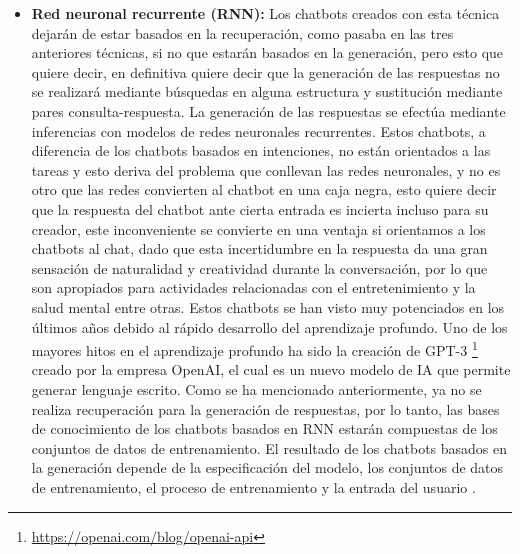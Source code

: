 \begin{itemize}
Muchas de las grandes plataformas actualmente están orientadas a la creación de chatbots de este tipo, como puede ser la plataforma de Google con Dialogflow \footnote{\url{https://dialogflow.cloud.google.com}} (originalmente llamado Api.ai) o la plataforma de código abierto de Rasa. \footnote{\url{https://rasa.com/}}.
\item \textbf{Red neuronal recurrente (RNN):} Los chatbots creados con esta técnica dejarán de estar basados en la recuperación, como pasaba en las tres anteriores técnicas, si no que estarán basados en la generación, pero esto que quiere decir, en definitiva quiere decir que la generación de las respuestas no se realizará mediante búsquedas en alguna estructura y sustitución mediante pares consulta-respuesta. La generación de las respuestas se efectúa mediante inferencias con modelos de redes neuronales recurrentes. Estos chatbots, a diferencia de los chatbots basados en intenciones, no están orientados a las tareas y esto deriva del problema que conllevan las redes neuronales, y no es otro que las redes convierten al chatbot en una caja negra, esto quiere decir que la respuesta del chatbot ante cierta entrada es incierta incluso para su creador, este inconveniente se convierte en una ventaja si orientamos a los chatbots al chat, dado que esta incertidumbre en la respuesta da una gran sensación de naturalidad y creatividad durante la conversación, por lo que son apropiados para actividades relacionadas con el entretenimiento y la salud mental entre otras. Estos chatbots se han visto muy potenciados en los últimos años debido al rápido desarrollo del aprendizaje profundo. Uno de los mayores hitos en el aprendizaje profundo ha sido la creación de GPT-3 \footnote{\url{https://openai.com/blog/openai-api}} creado por la empresa OpenAI, el cual es un nuevo modelo de \gls{IA} que permite generar lenguaje escrito. Como se ha mencionado anteriormente, ya no se realiza recuperación para la generación de respuestas, por lo tanto, las bases de conocimiento de los chatbots basados en RNN estarán compuestas de los conjuntos de datos de entrenamiento. El resultado de los chatbots basados en la generación depende de la especificación del modelo, los conjuntos de datos de entrenamiento, el proceso de entrenamiento y la entrada del usuario \cite{RefWorks:RefID:36-luo2022critical}.

\end{itemize}
